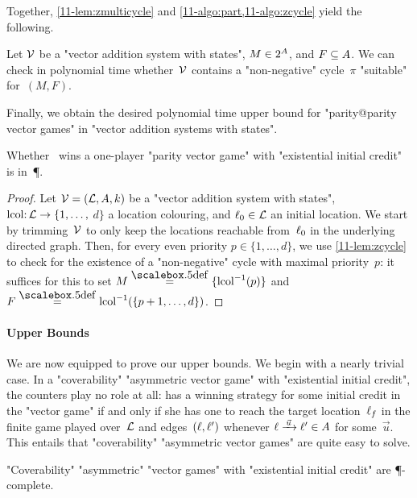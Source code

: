 \begin{scope}
Together, \cref{11-lem:zmulticycle}
and \cref{11-algo:part,11-algo:zcycle} yield the following.

\begin{lemma}
\label{11-lem:zcycle}
  Let $\mathcal V$ be a "vector addition system with states",
  $M\in 2^{A}$, and $F\subseteq A$.  We can check in polynomial
  time whether~$\mathcal V$ contains a "non-negative" cycle~$\pi$
  "suitable" for~$(M,F)$.
\end{lemma}

Finally, we obtain the desired polynomial time upper bound for
"parity@parity vector games" in "vector addition systems with states".
\begin{theorem}
\label{11-thm:zcycle}
  Whether \Eve\ wins a one-player "parity vector game" with
  "existential initial credit" is in~\P.
\end{theorem}
\begin{proof}
  Let $\mathcal V=(\mathcal L,A,k)$ be a "vector addition system with states",
  $\mathrm{lcol}{:}\,\mathcal L\to\{1,\dots,$ $d\}$ a location colouring, and
  $\ell_0\in\mathcal L$ an initial location.  We start by trimming~$\mathcal V$ to
  only keep the locations reachable from~$\ell_0$ in the underlying
  directed graph.  Then, for every even priority $p\in\{1,\dots,d\}$,
  we use \cref{11-lem:zcycle} to check for the existence of a
  "non-negative" cycle with maximal priority~$p$: it suffices for this
  to set $M\eqdef\{\lcol^{-1}(p)\}$ and
  $F\eqdef\lcol^{-1}(\{p+1,\dots,d\})$.
\end{proof}
\end{scope}

\paragraph{Upper Bounds}
We are now equipped to prove our upper bounds.  We begin with a nearly
trivial case.  In a "coverability" "asymmetric vector game" with
"existential initial credit", the counters play no role at all: \Eve
has a winning strategy for some initial credit in the "vector game" if
and only if she has one to reach the target location~$\ell_f$ in the
finite game played over~$\mathcal L$ and edges~$(\ell,\ell')$ whenever
$\loc\step{\vec u}\loc'\in\Act$ for some~$\vec u$.  This entails that
"coverability" "asymmetric vector games" are quite easy to solve.

\begin{theorem}
\label{11-th:cov-exist-P}
  "Coverability" "asymmetric" "vector games" with "existential initial
  credit" are \P-complete.
\end{theorem}

